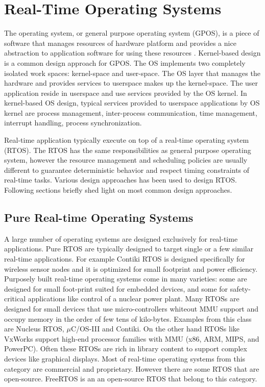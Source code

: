 \section{Real-Time Operating Systems} \label{sec:rtos-and-types}
The operating system, or general purpose operating system (GPOS), is a piece of software that manages resources of hardware platform and provides a nice abstraction to application software for using these resources \cite{Tanenbaum:2014:MOS:2655363}. Kernel-based design is a common design approach for GPOS. The OS implements two completely isolated work spaces: kernel-space and user-space. The OS layer that manages the hardware and provides services to userspace makes up the kernel-space. The user application reside in userspace and use services provided by the OS kernel. In kernel-based OS design, typical services provided to userspace applications by OS kernel are process management, inter-process communication, time management, interrupt handling, process synchronization. 

Real-time application typically execute on top of a real-time operating system (RTOS). 
The RTOS has the same responsibilities as general purpose operating system, however the resource management and scheduling policies are usually different to guarantee deterministic behavior and respect timing constraints of real-time tasks.
Various design approaches has been used to design RTOS.
Following sections briefly shed light on most common design approaches.

\subsection{Pure Real-time Operating Systems}
A large number of operating systems are designed exclusively for real-time applications.
Pure RTOS are typically designed to target single or a few similar real-time applications. 
For example Contiki RTOS \cite{Dunkels:2004:CLF:1032658.1034117} is designed specifically for wireless sensor nodes and it is optimized for small footprint and power efficiency.
Purposely built real-time operating systems come in many varieties: some are designed for small foot-print suited for embedded devices, and some for safety-critical applications like control of a nuclear power plant.
Many RTOSs are designed for small devices that use micro-controllers whiteout MMU support and occupy memory in the order of few tens of kilo-bytes. Examples from this class are Nucleus RTOS, $\mu$C/OS-III and Contiki.
On the other hand RTOSs like VxWorks support high-end processor families with MMU (x86, ARM, MIPS, and PowerPC). 
Often these RTOSs are rich in library content to support complex devices like graphical displays.
Most of real-time operating systems from this category are commercial and proprietary. However there are some RTOS that are open-source.
FreeRTOS is an an open-source RTOS that belong to this category.

